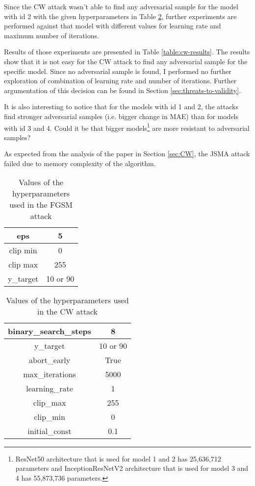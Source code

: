 Since the CW attack wasn't able to find any adversarial sample for the model with id 2 with the given hyperparameters in Table \ref{table:cw-params}, further experiments are performed against that model with different values for learning rate and maximum number of iterations.

Results of those experiments are presented in Table \ref{table:cw-results}. The results show that it is not easy for the CW attack to find any adversarial sample for the specific model. Since no adversarial sample is found, I performed no further exploration of combination of learning rate and number of iterations. Further argumentation of this decision can be found in Section \ref{sec:threats-to-validity}.

It is also interesting to notice that for the models with id 1 and 2, the attacks find stronger adversarial samples (i.e. bigger change in MAE) than for models with id 3 and 4. Could it be that bigger models\footnote{ResNet50 architecture that is used for model 1 and 2 has 25,636,712 parameters and InceptionResNetV2  architecture that is used for model 3 and 4 has 55,873,736 parameters.} are more resistant to adversarial samples? 

As expected from the analysis of the paper \cite{DBLP:journals/corr/CarliniW16a} in Section \ref{sec:CW}, the JSMA attack failed due to memory complexity of the algorithm.

\begin{table}[]
\centering
\begin{tabular}{|c|c|}
\hline
eps & 5 \\  \hline
clip min & 0  \\ \hline
clip max & 255 \\ \hline
y\_target & 10 or 90 \\ \hline
\end{tabular}
\caption{Values of the hyperparameters used in the FGSM attack}
\label{table:fgsm-params}
\end{table}

\begin{table}[]
\centering
\begin{tabular}{|c|c|}
\hline
binary\_search\_steps & 8 \\ \hline
y\_target & 10 or 90 \\ \hline
abort\_early & True \\ \hline
max\_iterations & 5000 \\ \hline
learning\_rate & 1 \\ \hline
clip\_max & 255 \\ \hline
clip\_min & 0 \\ \hline
initial\_const & 0.1 \\ \hline
\end{tabular}
\caption{Values of the hyperparameters  used in the CW attack}
\label{table:cw-params}
\end{table}

